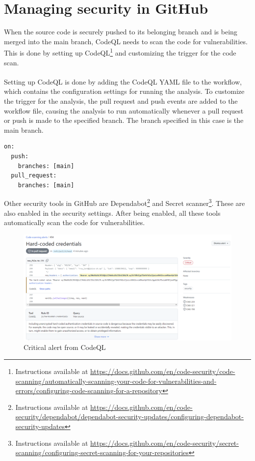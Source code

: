\section{Managing security in GitHub}
When the source code is securely pushed to its belonging branch and is being merged into the main branch, CodeQL needs to scan the code for vulnerabilities. This is done by setting up CodeQL\footnote{Instructions available at \url{https://docs.github.com/en/code-security/code-scanning/automatically-scanning-your-code-for-vulnerabilities-and-errors/configuring-code-scanning-for-a-repository}} and customizing the trigger for the code scan. 
\\~\\
Setting up CodeQL is done by adding the CodeQL YAML file to the workflow, which contains the configuration settings for running the analysis. To customize the trigger for the analysis, the pull request and push events are added to the workflow file, causing the analysis to run automatically whenever a pull request or push is made to the specified branch. The branch specified in this case is the main branch. \cite{CodeQLCustom}

\begin{tcolorbox}
\begin{verbatim}
on:
  push:
    branches: [main]
  pull_request:
    branches: [main]
\end{verbatim}
\end{tcolorbox}

 Other security tools in GitHub are Dependabot\footnote{Instructions available at \url{https://docs.github.com/en/code-security/dependabot/dependabot-security-updates/configuring-dependabot-security-updates}} and Secret scanner\footnote{Instructions available at \url{https://docs.github.com/en/code-security/secret-scanning/configuring-secret-scanning-for-your-repositories}}. These are also enabled in the security settings. After being enabled, all these tools automatically scan the code for vulnerabilities.

\begin{figure}[H]
    \centering
    \includegraphics[width=0.8\columnwidth]{Images/codescan.png}
    \caption{Critical alert from CodeQL}
    \label{fig: Critical alert CodeQL}
\end{figure}

